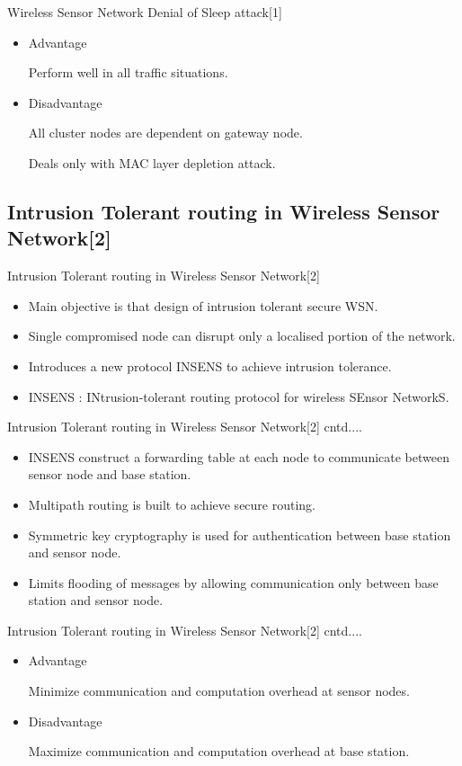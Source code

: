 \begin{frame}{Wireless Sensor Network Denial of Sleep attack[1]}
\begin{itemize}
\item Advantage

Perform well in all traffic situations.
\item  Disadvantage 

All cluster nodes are dependent on gateway node.

Deals only with MAC layer depletion attack.
\end{itemize}
\end{frame}

\subsection{Intrusion Tolerant routing in Wireless Sensor Network[2] }
\begin{frame}{Intrusion Tolerant routing in Wireless Sensor Network[2]}
\begin{itemize}
\item Main objective is that design of intrusion tolerant secure WSN.
\item Single compromised node can disrupt only a localised portion of the network.
\item Introduces a new protocol INSENS to achieve intrusion tolerance.
\item INSENS : INtrusion-tolerant routing protocol for wireless SEnsor NetworkS.
\end{itemize}
\end{frame}


\begin{frame}{Intrusion Tolerant routing in Wireless Sensor Network[2] cntd....}
\begin{itemize}
\item INSENS construct a forwarding table at each node to communicate between sensor node and base station.
\item Multipath routing is built to achieve secure routing.
\item Symmetric key cryptography is used for authentication between base station and sensor node.
\item Limits flooding of messages by allowing communication only between base station and sensor node.
\end{itemize}
\end{frame}

\begin{frame}{Intrusion Tolerant routing in Wireless Sensor Network[2] cntd....}
\begin{itemize}
\item Advantage

Minimize communication and computation overhead at sensor nodes.

\item Disadvantage

Maximize communication and computation overhead at base station.
\end{itemize}
\end{frame}


